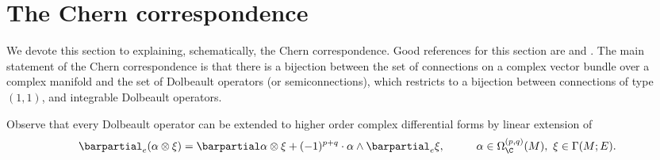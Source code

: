 \section{The Chern correspondence} \label{sec_Chern_correspond}
We devote this section to explaining, schematically, the Chern correspondence. Good references for this section are \parencite[Ch. 7]{kobayashi_complex_vector_bundles} and \parencite[Ch. 1]{teleman}. The main statement of the Chern correspondence is that there is a bijection between the set of connections on a complex vector bundle over a complex manifold and the set of Dolbeault operators (or semiconnections), which restricts to a bijection between connections of type \((1,1)\), and integrable Dolbeault operators. 

Observe that every Dolbeault operator can be extended to higher order complex differential forms by linear extension of
\begin{equation} \label{eq_ext_Dolb_operator}
\barpartial_e (\alpha \otimes \xi) = \barpartial \alpha \otimes \xi + (-1)^{p+q} \cdot \alpha \wedge \barpartial_e \xi, \hspace{1 cm} \alpha \in \Omega_\C^{(p,q)}(M), \ \xi \in \Gamma(M; E). 
\end{equation}

